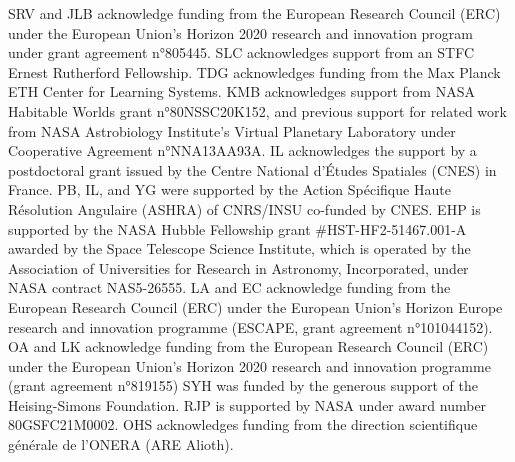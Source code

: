 \documentclass[usenatbib]{mnras}
\begin{document}
SRV and JLB acknowledge funding from the European Research Council (ERC) under the European Union’s Horizon 2020 research and innovation program under grant agreement n°805445.
SLC acknowledges support from an STFC Ernest Rutherford Fellowship. 
TDG acknowledges funding from the Max Planck ETH Center for Learning Systems.
KMB acknowledges support from NASA Habitable Worlds grant n°80NSSC20K152, and previous support for related work from NASA Astrobiology Institute's Virtual Planetary Laboratory under Cooperative Agreement n°NNA13AA93A.
IL acknowledges the support by a postdoctoral grant issued by the Centre National d'Études Spatiales (CNES) in France.
PB, IL, and YG were supported by the Action Spécifique Haute Résolution Angulaire (ASHRA) of CNRS/INSU co-funded by CNES.
EHP is supported by the NASA Hubble Fellowship grant \#HST-HF2-51467.001-A awarded by the Space Telescope Science Institute, which is operated by the Association of Universities for Research in Astronomy, Incorporated, under NASA contract NAS5-26555.
LA and EC acknowledge funding from the European Research Council (ERC) under the European Union's Horizon Europe research and innovation programme (ESCAPE, grant agreement n°101044152).
OA and LK acknowledge funding from the European Research Council (ERC) under the European Union’s Horizon 2020 research and innovation programme (grant agreement n°819155)
SYH was funded by the generous support of the Heising-Simons Foundation.
RJP is supported by NASA under award number 80GSFC21M0002.
OHS acknowledges funding from the direction scientifique générale de l'ONERA (ARE Alioth).











\end{document}
